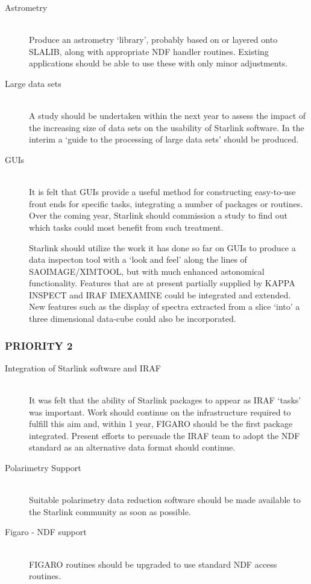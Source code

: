 \begin{description}
\item[Astrometry]\mbox{}\\
Produce an astrometry `library', probably based on or layered onto
SLALIB, along with appropriate NDF handler routines. Existing
applications should be able to use these with only minor adjustments.

\item[Large data sets]\mbox{}\\
A study should be undertaken within the next year to assess the impact
of the increasing size of data sets on the usability of Starlink
software. In the interim a `guide to the processing of large data
sets' should be produced.

\item[GUIs]\mbox{}\\
It is felt that GUIs provide a useful method for constructing
easy-to-use front ends for specific tasks, integrating a number of
packages or routines. Over the coming year, Starlink should commission
a study to find out which tasks could most benefit from such
treatment.

Starlink should utilize the work it has done so far on GUIs to produce
a data inspecton tool with a `look and feel' along the lines of
SAOIMAGE/XIMTOOL, but with much enhanced astonomical
functionality. Features that are at present partially supplied by
KAPPA INSPECT and IRAF IMEXAMINE could be integrated and extended. New
features such as the display of spectra extracted from a slice `into'
a three dimensional data-cube could also be incorporated.

\end{description}

\subsubsection{\label{ipSSG:IRAF}PRIORITY 2}

\begin{description}
\item[Integration of Starlink software and IRAF]\mbox{}\\
It was felt that the ability of Starlink packages to appear as IRAF
`tasks' was important. Work should continue on the infrastructure
required to fulfill this aim and, within 1 year, FIGARO should be the
first package integrated.  Present efforts to persuade the IRAF team
to adopt the NDF standard as an alternative data format should
continue.

\item[Polarimetry Support]\mbox{}\\
Suitable polarimetry data reduction software should be made available
to the Starlink community as soon as possible.

\item[\label{ipSSG:figaro}Figaro - NDF support]\mbox{}\\
FIGARO routines should be upgraded to use standard NDF access
routines.

\end{description}

